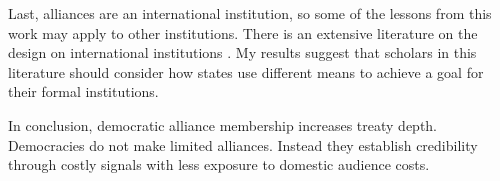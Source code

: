 \documentclass[12pt]{article}
\begin{document}
Last, alliances are an international institution, so some of the lessons from this work may apply to other institutions. 
There is an extensive literature on the design on international institutions \citep{DownesRocke1995, MartinSimmons1998, Koremenosetal2001, Koremenos2005, Thompson2010}.
My results suggest that scholars in this literature should consider how states use different means to achieve a goal for their formal institutions. 


In conclusion, democratic alliance membership increases treaty depth.  
Democracies do not make limited alliances.
Instead they establish credibility through costly signals with less exposure to domestic audience costs. 



\singlespace
 
 
\end{document}
